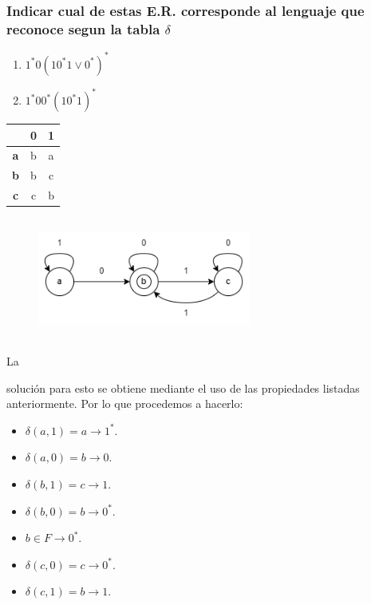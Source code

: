 \documentclass[stu, 12pt, letterpaper, donotrepeattitle, floatsintext, natbib]{apa7}
\begin{document}
\subsubsection{Indicar cual de estas E.R. corresponde al lenguaje que reconoce segun la tabla \(\delta\)}
\begin{enumerate}
    \item \(1^*0(10^*1\lor 0^*)^*\)
    \item \(1^*00^*(10^*1)^*\)
\end{enumerate}
\begin{table}[]
    \centering
    \begin{tabular}{c|cc}
    \cline{2-3}
    \multicolumn{1}{l|}{} & \textbf{0} & \textbf{1} \\ \hline
    \textbf{a}            & b          & a          \\
    \textbf{b}            & b          & c          \\
    \textbf{c}            & c          & b          \\ \hline
    \end{tabular}
    \end{table}
\begin{figure}[H]
    \centering
    \includegraphics[width=7cm, height=4cm]{automata_ej2.png}
\end{figure}
\vspace{\baselineskip}
La \begin{justifying}
    solución para esto se obtiene mediante el uso de las propiedades listadas anteriormente. Por lo que procedemos a hacerlo:
    \begin{itemize}
        \item \(\delta(a,1)=a\rightarrow 1^*\).
        \item \(\delta(a,0)=b\rightarrow 0\).
        \item \(\delta(b,1)=c\rightarrow 1\).
        \item \(\delta(b,0)=b\rightarrow 0^*\).
        \item \(b\in F\rightarrow 0^*\).
        \item \(\delta(c,0)=c\rightarrow 0^*\).
        \item \(\delta(c,1)=b\rightarrow 1\).
    \end{itemize}\par
\end{justifying}
\end{document}
